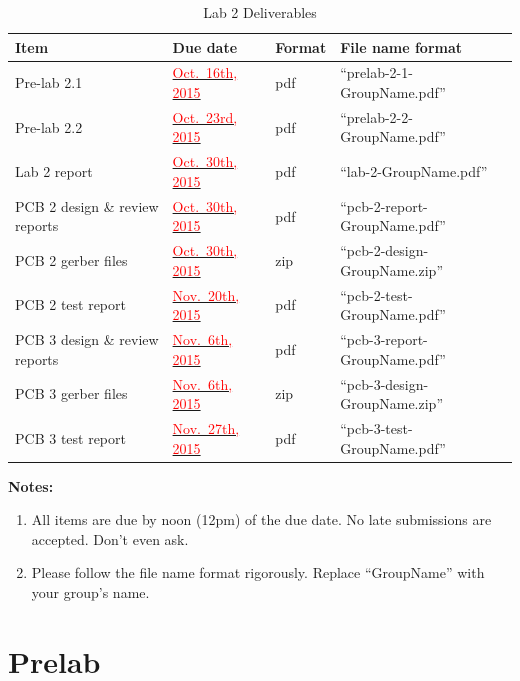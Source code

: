 \documentclass[letterpaper, 11pt]{article}
\newcommand{\due}[1]{\href{https://github.com/ucdart/UCD-EEC134/blob/master/support/schedule/eec134-schedule.pdf}{\textcolor{red}{#1}}}
\begin{document}
\vspace{0.5cm}

\begin{table}[h]
	\footnotesize
	\caption{Lab 2 Deliverables}
	\renewcommand{\arraystretch}{1.2}
	\begin{tabular}{|m{1in}|l|m{0.45in}|m{2in}|}
		\hline
		\textbf{Item} & \textbf{Due date} & \textbf{Format} & \textbf{File name format} \\
		\hline \hline
		Pre-lab 2.1 & \due{Oct.~16th, 2015} & pdf & ``prelab-2-1-GroupName.pdf'' \\
		\hline
		Pre-lab 2.2 & \due{Oct.~23rd, 2015} & pdf & ``prelab-2-2-GroupName.pdf''\\
		\hline
		Lab 2 report & \due{Oct.~30th, 2015} & pdf & ``lab-2-GroupName.pdf''\\
		\hline
		PCB 2 design \& review reports & \due{Oct.~30th, 2015} & pdf & ``pcb-2-report-GroupName.pdf''\\
		\hline
		PCB 2 gerber files & \due{Oct.~30th, 2015} & zip & ``pcb-2-design-GroupName.zip''\\
		\hline
		PCB 2 test report & \due{Nov.~20th, 2015} & pdf & ``pcb-2-test-GroupName.pdf''\\
		\hline
		PCB 3 design \& review reports & \due{Nov.~6th, 2015} & pdf & ``pcb-3-report-GroupName.pdf''\\
		\hline
		PCB 3 gerber files & \due{Nov.~6th, 2015} & zip & ``pcb-3-design-GroupName.zip''\\
		\hline
		PCB 3 test report & \due{Nov.~27th, 2015} & pdf & ``pcb-3-test-GroupName.pdf''\\
		\hline
	\end{tabular}
	\label{tab:deliverables}
\end{table}

\textbf{Notes:}
\begin{enumerate}
	\item All items are due by noon (12pm) of the due date. No late submissions are accepted. Don't even ask. 
	
	\item Please follow the file name format rigorously. Replace ``GroupName'' with your group's name. 
	
\end{enumerate}
	
\newpage
\section{Prelab}
\end{document}
